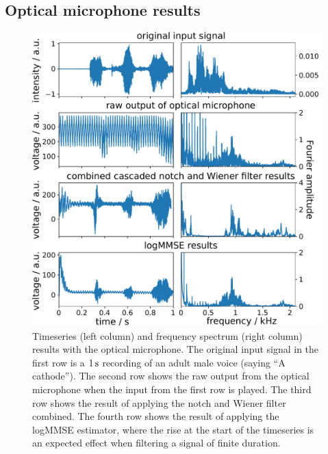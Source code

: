 \documentclass[paper-main.tex]{subfiles}
\begin{document}
\subsection{Optical microphone results}
\label{sec:opticalMicResults}

\begin{figure}
\begin{center}
\includegraphics[width=\textwidth]{figures/combined_highlight_results_melatos_labelled.pdf}
\caption{\label{fig:notchWienerLogMMSEResults}
Timeseries (left column) and frequency spectrum (right column) results with the optical microphone. 
The original input signal in the first row is a $1\,{\rm s}$ recording of an adult male voice (saying ``A cathode''). 
The second row shows the raw output from the optical microphone when the input from the first row is played. 
The third row shows the result of applying the notch and Wiener filter combined. 
The fourth row shows the result of applying the logMMSE estimator, where the rise at the start of the timeseries is an expected effect when filtering a signal of finite duration. 
}
\end{center}
\end{figure}
\end{document}
